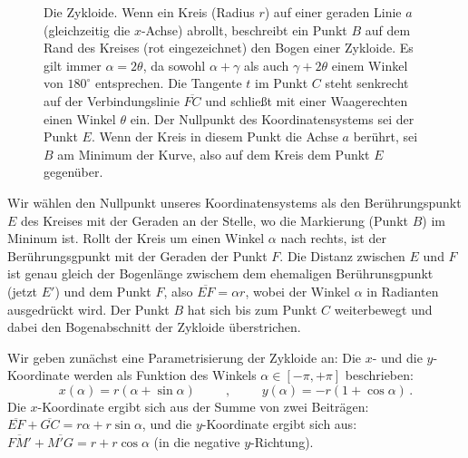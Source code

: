 \begin{figure}[htb]
\caption{\label{fig_Zykloide}%
Die Zykloide. Wenn ein Kreis (Radius $r$) auf einer geraden Linie $a$ (gleichzeitig die $x$-Achse)
abrollt, beschreibt ein Punkt $B$ auf dem
Rand des Kreises (rot eingezeichnet) den Bogen einer Zykloide. Es gilt immer $\alpha=2\theta$, da
sowohl $\alpha + \gamma$ als auch $\gamma + 2\theta$ einem Winkel von $180^\circ$ entsprechen.
Die Tangente $t$ im Punkt $C$ steht senkrecht auf der Verbindungslinie $\overline{FC}$ und schlie\ss t
mit einer Waagerechten einen Winkel $\theta$ ein. Der Nullpunkt des Koordinatensystems sei der
Punkt $E$. Wenn der Kreis in diesem Punkt die Achse $a$ ber\"uhrt, sei $B$ am Minimum der Kurve, also
auf dem Kreis dem Punkt $E$ gegen\"uber.} 
\end{figure}

Wir w\"ahlen den Nullpunkt unseres Koordinatensystems als den Ber\"uhrungspunkt $E$ des Kreises mit der
Geraden an der Stelle, wo die Markierung (Punkt $B$) im Mininum ist. Rollt der Kreis
um einen Winkel $\alpha$ nach rechts, ist der Ber\"uhrungsgpunkt mit der Geraden der Punkt $F$. Die
Distanz zwischen $E$ und $F$ ist genau gleich der Bogenl\"ange zwischem dem ehemaligen Ber\"uhrunsgpunkt
(jetzt $E'$) und dem Punkt $F$, also $\overline{EF}=\alpha r$, wobei der Winkel $\alpha$ in Radianten ausgedr\"uckt
wird. Der Punkt $B$ hat sich bis zum Punkt $C$ weiterbewegt und dabei den
Bogenabschnitt der Zykloide \"uberstrichen.

Wir geben zun\"achst eine Parametrisierung der Zykloide an: Die $x$- und die $y$-Koordinate werden als
Funktion des Winkels $\alpha\in [-\pi,+\pi]$ beschrieben:
\begin{equation}
        x(\alpha) = r ( \alpha + \sin \alpha )    \hspace{1cm} , \hspace{1cm}   y(\alpha) = - r (1+  \cos \alpha ) \, .
\end{equation}
Die $x$-Koordinate ergibt sich aus der Summe von zwei Beitr\"agen: $\overline{EF}+\overline{GC}=r\alpha + r\sin \alpha$,
und die $y$-Koordinate ergibt sich aus: $\overline{FM'} + \overline{M'G}=r + r\cos \alpha$ (in die negative $y$-Richtung). 

